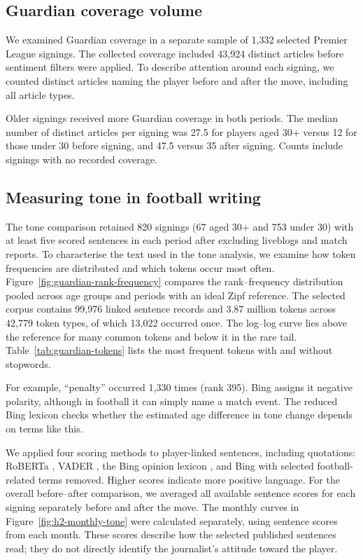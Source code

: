 \subsection*{Guardian coverage volume}

We examined Guardian coverage in a separate sample of 1,332 selected Premier League signings. The collected coverage included 43,924 distinct articles before sentiment filters were applied. To describe attention around each signing, we counted distinct articles naming the player before and after the move, including all article types.

Older signings received more Guardian coverage in both periods. The median number of distinct articles per signing was 27.5 for players aged 30+ versus 12 for those under 30 before signing, and 47.5 versus 35 after signing. Counts include signings with no recorded coverage.

\subsection*{Measuring tone in football writing}


The tone comparison retained 820 signings (67 aged 30+ and 753 under 30) with at least five scored sentences in each period after excluding liveblogs and match reports. To characterise the text used in the tone analysis, we examine how token frequencies are distributed and which tokens occur most often. Figure~\ref{fig:guardian-rank-frequency} compares the rank--frequency distribution pooled across age groups and periods with an ideal Zipf reference. The selected corpus contains 99,976 linked sentence records and 3.87 million tokens across 42,779 token types, of which 13,022 occurred once. The log--log curve lies above the reference for many common tokens and below it in the rare tail. Table~\ref{tab:guardian-tokens} lists the most frequent tokens with and without stopwords.

For example, ``penalty'' occurred 1,330 times (rank 395). Bing assigns it negative polarity, although in football it can simply name a match event. The reduced Bing lexicon checks whether the estimated age difference in tone change depends on terms like this.

We applied four scoring methods to player-linked sentences, including quotations: RoBERTa \cite{liu2019roberta,loureiro2022timelms,camachocollados2022tweetnlp,cardiffnlp2022checkpoint}, VADER \cite{hutto2014vader}, the Bing opinion lexicon \cite{hu2004mining}, and Bing with selected football-related terms removed. Higher scores indicate more positive language. For the overall before--after comparison, we averaged all available sentence scores for each signing separately before and after the move. The monthly curves in Figure~\ref{fig:h2-monthly-tone} were calculated separately, using sentence scores from each month. These scores describe how the selected published sentences read; they do not directly identify the journalist's attitude toward the player.

